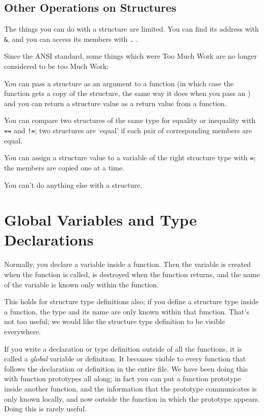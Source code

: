 \subsection{Other Operations on Structures}

The things you can do with a structure are limited.  You can find its
address with {\tt\&}, and you can access its members with {\tt .} .  

Since the ANSI standard, some things which were Too Much Work are no
longer considered to be too Much Work:

You can pass a structure as an argument to a function (in which case the
function gets a copy of the structure, the same way it does when you
pass an \int) and you can return a structure value as a return value
from a function. 

You can compare two structures of the same type for equality or
inequality with {\tt ==} and {\tt !=}; two structures are `equal' if
each pair of corresponding members are equal.  

You can assign a structure value to a variable of the right structure
type with {\tt =}; the members are copied one at a time.  

You can't do anything else with a structure.

\section{Global Variables and Type Declarations}

Normally, you declare a variable inside a function.  Then the variable
is created when the function is called, is destroyed when the function
returns, and the name of the variable is known only within the function.

This holds for structure type definitions also; if you define a
structure type inside a function, the type and its name are only known
within that function.  That's not too useful; we would like the
structure type definition to be visible everywhere.

If you write a declaration or type definition outside of all the
functions, it is called a {\em global}\/ variable or definition.  It
becomes visible to every function that follows the declaration or
definition in the entire file.  We have been doing this with function
prototypes all along; in fact you can put a function prototype inside
another function, and the information that the prototype communicates is
only known locally, and now outside the function in which the prototype
appears.  Doing this is rarely useful.

